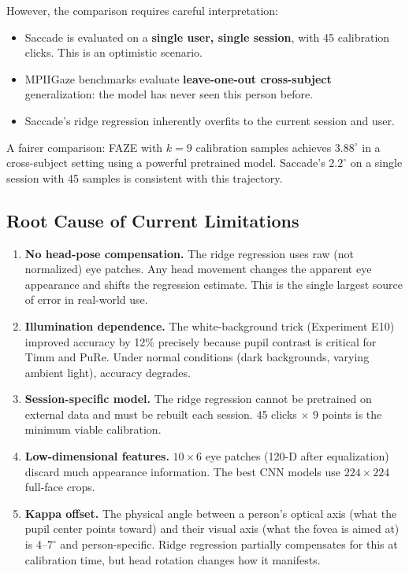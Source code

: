 \documentclass[11pt,a4paper]{article}
\begin{document}
However, the comparison requires careful interpretation:
\begin{itemize}
  \item Saccade is evaluated on a \textbf{single user, single session}, with 45 calibration clicks. This is an optimistic scenario.
  \item MPIIGaze benchmarks evaluate \textbf{leave-one-out cross-subject} generalization: the model has never seen this person before.
  \item Saccade's ridge regression inherently overfits to the current session and user.
\end{itemize}
A fairer comparison: FAZE with $k=9$ calibration samples achieves $3.88^\circ$ in a cross-subject setting using a powerful pretrained model. Saccade's $2.2^\circ$ on a single session with 45 samples is consistent with this trajectory.

\subsection{Root Cause of Current Limitations}

\begin{enumerate}
  \item \textbf{No head-pose compensation.} The ridge regression uses raw (not normalized) eye patches. Any head movement changes the apparent eye appearance and shifts the regression estimate. This is the single largest source of error in real-world use.

  \item \textbf{Illumination dependence.} The white-background trick (Experiment E10) improved accuracy by 12\% precisely because pupil contrast is critical for Timm and PuRe. Under normal conditions (dark backgrounds, varying ambient light), accuracy degrades.

  \item \textbf{Session-specific model.} The ridge regression cannot be pretrained on external data and must be rebuilt each session. 45 clicks $\times$ 9 points is the minimum viable calibration.

  \item \textbf{Low-dimensional features.} $10\times6$ eye patches (120-D after equalization) discard much appearance information. The best CNN models use $224\times224$ full-face crops.

  \item \textbf{Kappa offset.} The physical angle between a person's optical axis (what the pupil center points toward) and their visual axis (what the fovea is aimed at) is $4$--$7^\circ$ and person-specific. Ridge regression partially compensates for this at calibration time, but head rotation changes how it manifests.
\end{enumerate}
\end{document}
